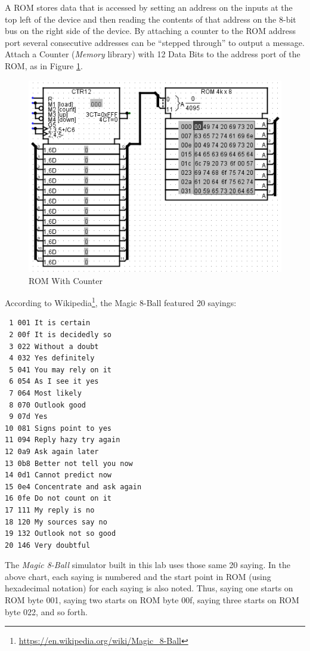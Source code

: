A ROM stores data that is accessed by setting an address on the inputs at the top left of the device and then reading the contents of that address on the 8-bit bus on the right side of the device. By attaching a counter to the ROM address port several consecutive addresses can be ``stepped through'' to output a message. Attach a Counter (\textit{Memory} library) with 12 Data Bits to the address port of the ROM, as in Figure \ref{fig:09-03}.

\begin{figure}[H]
	\centering
	\includegraphics[width=\maxwidth{.95\linewidth}]{gfx/09-03}
	\caption{ROM With Counter}
	\label{fig:09-03}
\end{figure}

According to Wikipedia\footnote{\url{https://en.wikipedia.org/wiki/Magic_8-Ball}}, the Magic 8-Ball featured 20 sayings: 

\begin{verbatim}
 1 001 It is certain
 2 00f It is decidedly so
 3 022 Without a doubt
 4 032 Yes definitely
 5 041 You may rely on it
 6 054 As I see it yes
 7 064 Most likely
 8 070 Outlook good
 9 07d Yes
10 081 Signs point to yes
11 094 Reply hazy try again
12 0a9 Ask again later
13 0b8 Better not tell you now
14 0d1 Cannot predict now
15 0e4 Concentrate and ask again
16 0fe Do not count on it
17 111 My reply is no
18 120 My sources say no
19 132 Outlook not so good
20 146 Very doubtful
\end{verbatim}

The \textit{Magic 8-Ball} simulator built in this lab uses those same 20 saying. In the above chart, each saying is numbered and the start point in ROM (using hexadecimal notation) for each saying is also noted. Thus, saying one starts on ROM byte 001, saying two starts on ROM byte 00f, saying three starts on ROM byte 022, and so forth.

